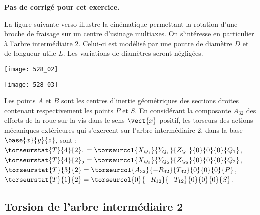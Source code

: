 \normaltrue
\correctionfalse


\setcounter{question}{0}

\ifcorrection
\else
\textbf{Pas de corrigé pour cet exercice.}
\fi

\ifprof
\else

La figure suivante verso illustre la cinématique permettant la rotation d'une broche de fraisage sur un centre d'usinage multiaxes.
On s'intéresse en particulier à l'arbre intermédiaire 2. Celui-ci est modélisé  par une poutre de diamètre $D$ et de longueur utile $L$. Les variations de diamètres seront négligées.

\begin{center}
\texttt{[image: 528\_02]}
\end{center}


\begin{center}
\texttt{[image: 528\_03]}
\end{center}


Les points $A$ et $B$ sont les centres d’inertie géométriques des sections droites contenant
respectivement les points $P$ et $S$.
En considérant la composante $A_{32}$ des efforts de la roue sur la vis dans le sens $\vect{x}$ positif, les
torseurs des actions mécaniques extérieures qui s’exercent sur l’arbre intermédiaire 2, dans la base
$\base{x}{y}{z}$, sont :
$\torseurstat{T}{4}{2}_1 = \torseurcol{X_{Q_1}}{Y_{Q_1}}{Z_{Q_1}}{0}{0}{0}{Q_1}$, 
$\torseurstat{T}{4}{2}_2 = \torseurcol{X_{Q_2}}{Y_{Q_2}}{Z_{Q_2}}{0}{0}{0}{Q_2}$, 
$\torseurstat{T}{3}{2} = \torseurcol{A_{32}}{-R_{32}}{T_{32}}{0}{0}{0}{P}$, 
$\torseurstat{T}{1}{2} = \torseurcol{0}{-R_{12}}{-T_{12}}{0}{0}{0}{S}$.

\fi




\subsection*{Torsion de l’arbre intermédiaire 2}

